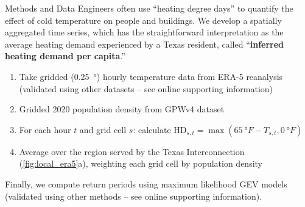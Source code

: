 \begin{block}{Methods and Data}
    Engineers often use ``heating degree days'' to quantify the effect of cold temperature on people and buildings.
    We develop a spatially aggregated time series, which has the straightforward interpretation as the average heating demand experienced by a Texas resident, called ``\textbf{inferred heating demand per capita}.''
    \begin{enumerate}
        \item Take gridded (\SI{0.25}{\degree}) hourly temperature data from ERA-5 reanalysis \cite{hersbach_era5:2020} (validated using other datasets -- see online supporting information)
        \item Gridded 2020 population density from GPWv4 dataset \cite{ciesin_gpwv4:2016}
        \item For each hour $t$ and grid cell $s$: calculate
              $\text{HD}_{s,t} = \max (\SI{65}{\degree F} - T_{s,t}, \SI{0}{\degree F})$
        \item Average over the region served by the Texas Interconnection (\cref{fig:local_era5}a), weighting each grid cell by population density
    \end{enumerate}
    Finally, we compute return periods using maximum likelihood GEV models (validated using other methods -- see online supporting information).
\end{block}